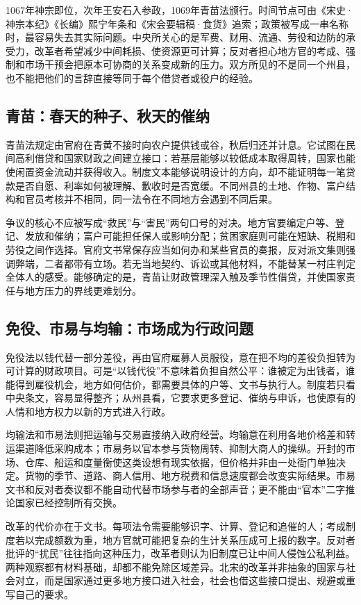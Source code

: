 1067年神宗即位，次年王安石入参政，1069年青苗法颁行。时间节点可由《宋史·神宗本纪》《长编》熙宁年条和《宋会要辑稿·食货》追索；政策被写成一串名称时，最容易失去其实际问题。中央所关心的是军费、财用、流通、劳役和边防的承受力，改革者希望减少中间耗损、使资源更可计算；反对者担心地方官的考成、强制和市场干预会把原本可协商的关系变成新的压力。双方所见的不是同一个州县，也不能把他们的言辞直接等同于每个借贷者或役户的经验。

\subsection{青苗：春天的种子、秋天的催纳}

青苗法规定由官府在青黄不接时向农户提供钱或谷，秋后归还并计息。它试图在民间高利借贷和国家财政之间建立接口：若基层能够以较低成本取得周转，国家也能使闲置资金流动并获得收入。制度文本能够说明设计的方向，却不能证明每一笔贷款是否自愿、利率如何被理解、歉收时是否宽缓。不同州县的土地、作物、富户结构和官员考核并不相同，同一法令在不同地方会遇到不同后果。

争议的核心不应被写成“救民”与“害民”两句口号的对决。地方官要编定户等、登记、发放和催纳；富户可能担任保人或影响分配；贫困家庭则可能在短缺、税期和劳役之间作选择。官府文书常保存应当如何办和某些官员的奏报，反对派文集则强调弊端，二者都带有立场。若无当地契约、诉讼或其他材料，不能替某一村庄判定全体人的感受。能够确定的是，青苗让财政管理深入触及季节性借贷，并使国家责任与地方压力的界线更难划分。

\subsection{免役、市易与均输：市场成为行政问题}

免役法以钱代替一部分差役，再由官府雇募人员服役，意在把不均的差役负担转为可计算的财政项目。可是“以钱代役”不意味着负担自然公平：谁被定为出钱者，谁能得到雇役机会，地方如何估价，都需要具体的户等、文书与执行人。制度若只看中央条文，容易显得整齐；从州县看，它要求更多登记、催纳与申诉，也使原有的人情和地方权力以新的方式进入行政。

均输法和市易法则把运输与交易直接纳入政府经营。均输意在利用各地价格差和转运渠道降低采购成本；市易务以官本参与货物周转、抑制大商人的操纵。开封的市场、仓库、船运和度量衡使这类设想有现实依据，但价格并非由一处衙门单独决定。货物的季节、道路、商人信用、地方税费和信息速度都会改变实际结果。市易文书和反对者奏议都不能自动代替市场参与者的全部声音；更不能由“官本”二字推论国家已经控制所有交换。

改革的代价亦在于文书。每项法令需要能够识字、计算、登记和追催的人；考成制度若以完成额数为重，地方官就可能把复杂的生计关系压成可上报的数字。反对者批评的“扰民”往往指向这种压力，改革者则认为旧制度已让中间人侵蚀公私利益。两种观察都有材料基础，却都不能免除区域差异。北宋的改革并非抽象的国家与社会对立，而是国家通过更多地方接口进入社会，社会也借这些接口提出、规避或重写自己的要求。

